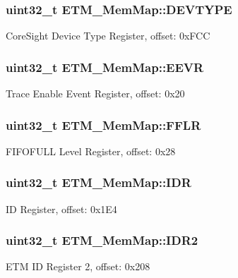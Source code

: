 \subsubsection[{D\+E\+V\+T\+Y\+P\+E}]{\setlength{\rightskip}{0pt plus 5cm}uint32\+\_\+t E\+T\+M\+\_\+\+Mem\+Map\+::\+D\+E\+V\+T\+Y\+P\+E}\label{struct_e_t_m___mem_map_a860e1c89b58a257cd4783a2c488360ee}
Core\+Sight Device Type Register, offset\+: 0x\+F\+C\+C \hypertarget{struct_e_t_m___mem_map_a8f38f88c8652ae9e793d53c519dd657e}{}
\subsubsection[{E\+E\+V\+R}]{\setlength{\rightskip}{0pt plus 5cm}uint32\+\_\+t E\+T\+M\+\_\+\+Mem\+Map\+::\+E\+E\+V\+R}\label{struct_e_t_m___mem_map_a8f38f88c8652ae9e793d53c519dd657e}
Trace Enable Event Register, offset\+: 0x20 \hypertarget{struct_e_t_m___mem_map_ad9b815d0f98a1553e6ca965a2d0c2264}{}
\subsubsection[{F\+F\+L\+R}]{\setlength{\rightskip}{0pt plus 5cm}uint32\+\_\+t E\+T\+M\+\_\+\+Mem\+Map\+::\+F\+F\+L\+R}\label{struct_e_t_m___mem_map_ad9b815d0f98a1553e6ca965a2d0c2264}
F\+I\+F\+O\+F\+U\+L\+L Level Register, offset\+: 0x28 \hypertarget{struct_e_t_m___mem_map_a86a9b1a2c070dbd2726e755884425de5}{}
\subsubsection[{I\+D\+R}]{\setlength{\rightskip}{0pt plus 5cm}uint32\+\_\+t E\+T\+M\+\_\+\+Mem\+Map\+::\+I\+D\+R}\label{struct_e_t_m___mem_map_a86a9b1a2c070dbd2726e755884425de5}
I\+D Register, offset\+: 0x1\+E4 \hypertarget{struct_e_t_m___mem_map_a584ac31c6dcec464f98ceece5b76d1f6}{}
\subsubsection[{I\+D\+R2}]{\setlength{\rightskip}{0pt plus 5cm}uint32\+\_\+t E\+T\+M\+\_\+\+Mem\+Map\+::\+I\+D\+R2}\label{struct_e_t_m___mem_map_a584ac31c6dcec464f98ceece5b76d1f6}
E\+T\+M I\+D Register 2, offset\+: 0x208 \hypertarget{struct_e_t_m___mem_map_aa5fdf34d92821f87bbcde2dbb43a6d3c}{}
